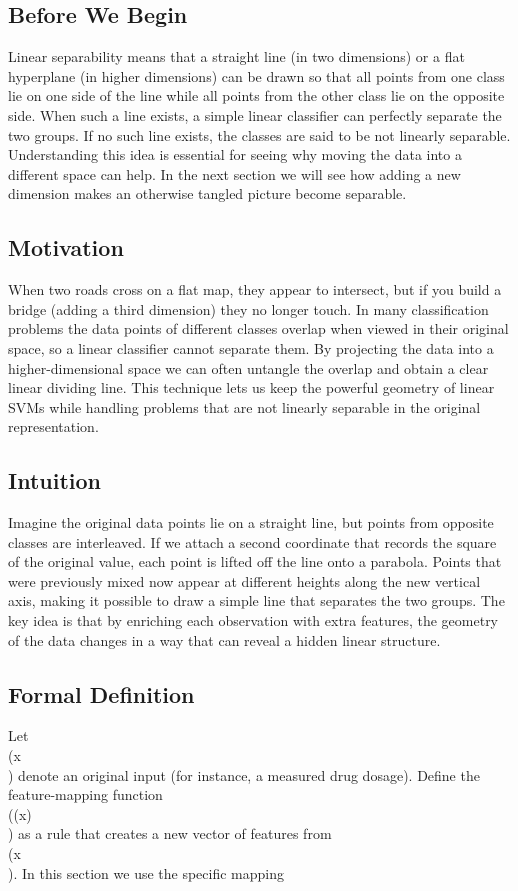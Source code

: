 \documentclass[12pt, a4paper]{article}
\begin{document}
\subsection{Before We Begin}
Linear separability means that a straight line (in two dimensions) or a flat hyperplane (in higher dimensions) can be drawn so that all points from one class lie on one side of the line while all points from the other class lie on the opposite side. When such a line exists, a simple linear classifier can perfectly separate the two groups. If no such line exists, the classes are said to be not linearly separable. Understanding this idea is essential for seeing why moving the data into a different space can help. In the next section we will see how adding a new dimension makes an otherwise tangled picture become separable.

\subsection{Motivation}
When two roads cross on a flat map, they appear to intersect, but if you build a bridge (adding a third dimension) they no longer touch.  In many classification problems the data points of different classes overlap when viewed in their original space, so a linear classifier cannot separate them. By projecting the data into a higher-dimensional space we can often untangle the overlap and obtain a clear linear dividing line. This technique lets us keep the powerful geometry of linear SVMs while handling problems that are not linearly separable in the original representation.

\subsection{Intuition}
Imagine the original data points lie on a straight line, but points from opposite classes are interleaved. If we attach a second coordinate that records the square of the original value, each point is lifted off the line onto a parabola. Points that were previously mixed now appear at different heights along the new vertical axis, making it possible to draw a simple line that separates the two groups. The key idea is that by enriching each observation with extra features, the geometry of the data changes in a way that can reveal a hidden linear structure.

\subsection{Formal Definition}
Let \\(x\\) denote an original input (for instance, a measured drug dosage).  
Define the feature-mapping function \\(\phi(x)\\) as a rule that creates a new vector of features from \\(x\\). In this section we use the specific mapping  
\end{document}
